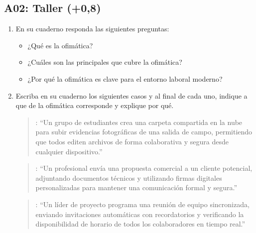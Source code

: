 \documentclass[letterpaper,10pt,spanish]{sphinxmanual}
\begin{document}
\subsection{A02: Taller (+0,8)}
\label{\detokenize{1_guias/10ofimatica/G1011:a02-taller-0-8}}
\sphinxAtStartPar
{}
\begin{enumerate}
%
\item {} 
\sphinxAtStartPar
En su cuaderno responda las siguientes preguntas:
\begin{itemize}
\item {} 
\sphinxAtStartPar
¿Qué es la ofimática?

\item {} 
\sphinxAtStartPar
¿Cuáles son las principales  que cubre la ofimática?

\item {} 
\sphinxAtStartPar
¿Por qué la ofimática es clave para el entorno laboral moderno?

\end{itemize}

\item {} 
\sphinxAtStartPar
Escriba en su cuaderno los siguientes casos y al final de cada uno, indique a que  de la ofimática corresponde y explique por qué.
\begin{quote}

\sphinxAtStartPar
{}: “Un grupo de estudiantes crea una carpeta compartida en la nube para subir evidencias fotográficas de una salida de campo, permitiendo que todos editen archivos de forma colaborativa y segura desde cualquier dispositivo.”
\end{quote}
\begin{quote}

\sphinxAtStartPar
{}: “Un profesional envía una propuesta comercial a un cliente potencial, adjuntando documentos técnicos y utilizando firmas digitales personalizadas para mantener una comunicación formal y segura.”
\end{quote}
\begin{quote}

\sphinxAtStartPar
{}: “Un líder de proyecto programa una reunión de equipo sincronizada, enviando invitaciones automáticas con recordatorios y verificando la disponibilidad de horario de todos los colaboradores en tiempo real.”
\end{quote}
\begin{quote}


\end{quote}
\end{enumerate}
\end{document}
